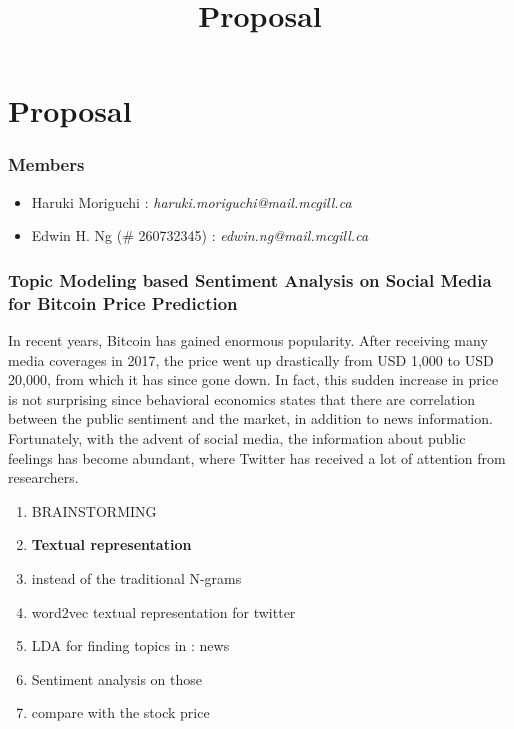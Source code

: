 \documentclass[12pt,a4paper]{report}
\begin{document}
\title{Proposal\\
}


\setcounter{page}{1}
\thispagestyle{empty} 


\chapter*{Proposal}
\subsection*{Members}
\begin{itemize}
\item Haruki Moriguchi : \textit{haruki.moriguchi@mail.mcgill.ca}
\item Edwin H. Ng (\# 260732345) : \textit{edwin.ng@mail.mcgill.ca}
\end{itemize}
\subsection*{Topic Modeling based Sentiment Analysis on Social Media for Bitcoin Price Prediction}
\par \qquad In recent years, Bitcoin has gained enormous popularity. After receiving many media coverages in 2017, the  price went up drastically from USD 1,000 to USD 20,000, from which it has since gone down. In fact, this sudden increase in price is not surprising since behavioral economics states that there are correlation between the public sentiment and the market, in addition to news information. Fortunately, with the advent of social media, the information about public feelings has become abundant, where Twitter has received a lot of attention from researchers.
\\
\begin{enumerate}
\item BRAINSTORMING
\item \textbf{Textual representation}
\item instead of the traditional N-grams
\item  word2vec textual representation  for twitter
\item LDA for finding topics in : news 
\item Sentiment analysis on those
\item compare with the stock price
\end{enumerate}
\end{document}
